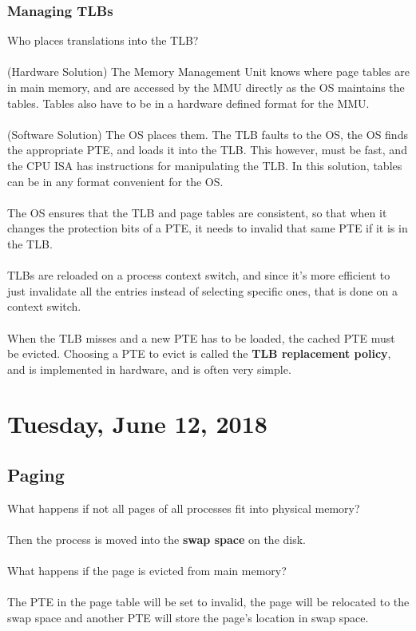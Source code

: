 \documentclass{article}
\begin{document}
\subsubsection{Managing TLBs}

Who places translations into the TLB?\\
\\
(Hardware Solution) The Memory Management Unit knows where page tables are in main memory, and are accessed by the MMU directly as the OS maintains the tables. Tables also have to be in a hardware defined format for the MMU.\\
\\
(Software Solution) The OS places them. The TLB faults to the OS, the OS finds the appropriate PTE, and loads it into the TLB. This however, must be fast, and the CPU ISA has instructions for manipulating the TLB. In this solution, tables can be in any format convenient for the OS.\\
\\
The OS ensures that the TLB and page tables are consistent, so that when it changes the protection bits of a PTE, it needs to invalid that same PTE if it is in the TLB.\\
\\
TLBs are reloaded on a process context switch, and since it's more efficient to just invalidate all the entries instead of selecting specific ones, that is done on a context switch.\\
\\
When the TLB misses and a new PTE has to be loaded, the cached PTE must be evicted. Choosing a PTE to evict is called the \textbf{TLB replacement policy}, and is implemented in hardware, and is often very simple.

\newpage

\section{Tuesday, June 12, 2018}

\subsection{Paging}

What happens if not all pages of all processes fit into physical memory?\\
\\
Then the process is moved into the \textbf{swap space} on the disk.\\
\\
What happens if the page is evicted from main memory?\\
\\
The PTE in the page table will be set to invalid, the page will be relocated to the swap space and another PTE will store the page's location in swap space.
\end{document}
